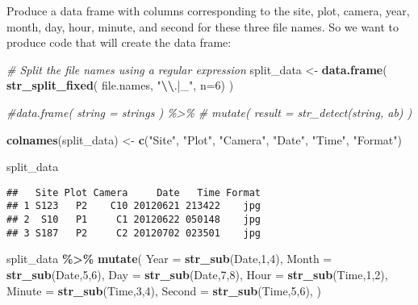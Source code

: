 \documentclass[
]{article}
\newenvironment{Shaded}{\begin{snugshade}}{\end{snugshade}}
\newcommand{\AttributeTok}[1]{\textcolor[rgb]{0.13,0.29,0.53}{#1}}
\newcommand{\CommentTok}[1]{\textcolor[rgb]{0.56,0.35,0.01}{\textit{#1}}}
\newcommand{\DecValTok}[1]{\textcolor[rgb]{0.00,0.00,0.81}{#1}}
\newcommand{\FunctionTok}[1]{\textcolor[rgb]{0.13,0.29,0.53}{\textbf{#1}}}
\newcommand{\NormalTok}[1]{#1}
\newcommand{\OtherTok}[1]{\textcolor[rgb]{0.56,0.35,0.01}{#1}}
\newcommand{\SpecialCharTok}[1]{\textcolor[rgb]{0.81,0.36,0.00}{\textbf{#1}}}
\newcommand{\StringTok}[1]{\textcolor[rgb]{0.31,0.60,0.02}{#1}}
\begin{document}
Produce a data frame with columns corresponding to the site, plot,
camera, year, month, day, hour, minute, and second for these three file
names. So we want to produce code that will create the data frame:

\begin{Shaded}
\begin{Highlighting}[]
\CommentTok{\# Split the file names using a regular expression}
\NormalTok{split\_data }\OtherTok{\textless{}{-}} \FunctionTok{data.frame}\NormalTok{( }\FunctionTok{str\_split\_fixed}\NormalTok{( file.names, }\StringTok{"}\SpecialCharTok{\textbackslash{}\textbackslash{}}\StringTok{.|\_"}\NormalTok{, }\AttributeTok{n=}\DecValTok{6}\NormalTok{) )}

\CommentTok{\#data.frame( string = strings ) \%\textgreater{}\%}
\CommentTok{\#  mutate( result = str\_detect(string, \textquotesingle{}ab\textquotesingle{}) )}


\FunctionTok{colnames}\NormalTok{(split\_data) }\OtherTok{\textless{}{-}} \FunctionTok{c}\NormalTok{(}\StringTok{"Site"}\NormalTok{, }\StringTok{"Plot"}\NormalTok{, }\StringTok{"Camera"}\NormalTok{, }\StringTok{"Date"}\NormalTok{, }\StringTok{"Time"}\NormalTok{, }\StringTok{"Format"}\NormalTok{)}

\NormalTok{split\_data}
\end{Highlighting}
\end{Shaded}

\begin{verbatim}
##   Site Plot Camera     Date   Time Format
## 1 S123   P2    C10 20120621 213422    jpg
## 2  S10   P1     C1 20120622 050148    jpg
## 3 S187   P2     C2 20120702 023501    jpg
\end{verbatim}

\begin{Shaded}
\begin{Highlighting}[]
\NormalTok{split\_data }\SpecialCharTok{\%\textgreater{}\%} \FunctionTok{mutate}\NormalTok{(}
  \AttributeTok{Year =} \FunctionTok{str\_sub}\NormalTok{(Date,}\DecValTok{1}\NormalTok{,}\DecValTok{4}\NormalTok{),}
  \AttributeTok{Month =} \FunctionTok{str\_sub}\NormalTok{(Date,}\DecValTok{5}\NormalTok{,}\DecValTok{6}\NormalTok{),}
  \AttributeTok{Day =} \FunctionTok{str\_sub}\NormalTok{(Date,}\DecValTok{7}\NormalTok{,}\DecValTok{8}\NormalTok{),}
  \AttributeTok{Hour =} \FunctionTok{str\_sub}\NormalTok{(Time,}\DecValTok{1}\NormalTok{,}\DecValTok{2}\NormalTok{),}
  \AttributeTok{Minute =} \FunctionTok{str\_sub}\NormalTok{(Time,}\DecValTok{3}\NormalTok{,}\DecValTok{4}\NormalTok{),}
  \AttributeTok{Second =} \FunctionTok{str\_sub}\NormalTok{(Time,}\DecValTok{5}\NormalTok{,}\DecValTok{6}\NormalTok{),}
\NormalTok{)}
\end{Highlighting}
\end{Shaded}
\end{document}
